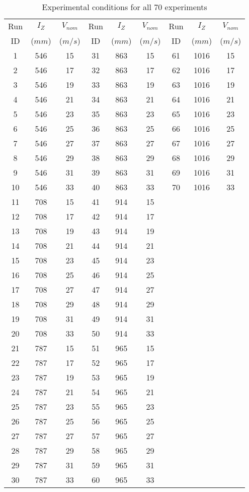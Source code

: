 \renewcommand\baselinestretch{1.3}\selectfont
\begin{table}[H]
\begin{center}
\begin{tabular}{|ccc||ccc||ccc|}
	\hline
	Run & $I_Z$  & $V_{nom}$ & Run & $I_Z$  & $V_{nom}$ & Run & $I_Z$  & $V_{nom}$\\
	ID & ($mm$) & ($m/s$) & ID & ($mm$) & ($m/s$) & ID & ($mm$) & ($m/s$)\\
	\hline
	1 & 546 & 15 & 31 & 863 & 15 & 61 & 1016 & 15\\
	2 & 546 & 17 & 32 & 863 & 17 & 62 & 1016 & 17\\
	3 & 546 & 19 & 33 & 863 & 19 & 63 & 1016 & 19\\
	4 & 546 & 21 & 34 & 863 & 21 & 64 & 1016 & 21\\
	5 & 546 & 23 & 35 & 863 & 23 & 65 & 1016 & 23\\
	6 & 546 & 25 & 36 & 863 & 25 & 66 & 1016 & 25\\
	7 & 546 & 27 & 37 & 863 & 27 & 67 & 1016 & 27\\
	8 & 546 & 29 & 38 & 863 & 29 & 68 & 1016 & 29\\
	9 & 546 & 31 & 39 & 863 & 31 & 69 & 1016 & 31\\
	10 & 546 & 33 & 40 & 863 & 33 & 70 & 1016 & 33\\
	11 & 708 & 15 & 41 & 914 & 15 &   &   &  \\
	12 & 708 & 17 & 42 & 914 & 17 &   &   &  \\
	13 & 708 & 19 & 43 & 914 & 19 &   &   &  \\
	14 & 708 & 21 & 44 & 914 & 21 &   &   &  \\
	15 & 708 & 23 & 45 & 914 & 23 &   &   &  \\
	16 & 708 & 25 & 46 & 914 & 25 &   &   &  \\
	17 & 708 & 27 & 47 & 914 & 27 &   &   &  \\
	18 & 708 & 29 & 48 & 914 & 29 &   &   &  \\
	19 & 708 & 31 & 49 & 914 & 31 &   &   &  \\
	20 & 708 & 33 & 50 & 914 & 33 &   &   &  \\
	21 & 787 & 15 & 51 & 965 & 15 &   &   &  \\
	22 & 787 & 17 & 52 & 965 & 17 &   &   &  \\
	23 & 787 & 19 & 53 & 965 & 19 &   &   &  \\
	24 & 787 & 21 & 54 & 965 & 21 &   &   &  \\
	25 & 787 & 23 & 55 & 965 & 23 &   &   &  \\
	26 & 787 & 25 & 56 & 965 & 25 &   &   &  \\
	27 & 787 & 27 & 57 & 965 & 27 &   &   &  \\
	28 & 787 & 29 & 58 & 965 & 29 &   &   &  \\
	29 & 787 & 31 & 59 & 965 & 31 &   &   &  \\
	30 & 787 & 33 & 60 & 965 & 33 &   &   &  \\
	\hline
\end{tabular}
\caption{Experimental conditions for all 70 experiments}
\label{table:test_matrix_table}
\end{center}
\end{table}
\renewcommand\baselinestretch{2}\selectfont

